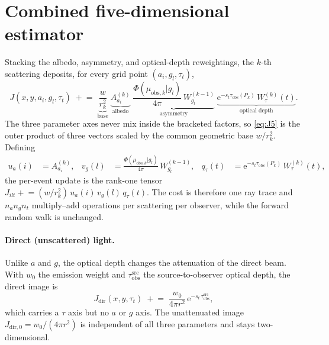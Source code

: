 \documentclass[english,a4paper]{kiseon_memo}
\newcommand{\ee}{\mathrm{e}}
\newcommand{\obs}{\mathrm{obs}}
\newcommand{\HG}{\Phi}
\newcommand{\src}{\mathrm{src}}
\begin{document}
\section{Combined five-dimensional estimator}

Stacking the albedo, asymmetry, and optical-depth reweightings, the $k$-th
scattering deposits, for every grid point $(a_i,g_l,\tau_t)$,
\begin{equation}
  J(x,y,a_i,g_l,\tau_t)\;\mathrel{+}=\;
  \underbrace{\frac{w}{r_k^2}}_{\text{base}}\;
  \underbrace{A_{a_i}^{(k)}}_{\text{albedo}}\;
  \underbrace{\frac{\HG(\mu_{\obs,k}|g_l)}{4\pi}\,W_{g_l}^{(k-1)}}_{\text{asymmetry}}\;
  \underbrace{\ee^{-s_t\tau_\obs(P_k)}\,W_\tau^{(k)}(t)}_{\text{optical depth}} .
  \label{eq:J5}
\end{equation}
The three parameter axes never mix inside the bracketed factors, so
\eqref{eq:J5} is the outer product of three vectors scaled by the common
geometric base $w/r_k^2$.  Defining
\begin{align}
  u_a(i) &= A_{a_i}^{(k)}, &
  v_g(l) &= \frac{\HG(\mu_{\obs,k}|g_l)}{4\pi}\,W_{g_l}^{(k-1)}, &
  q_\tau(t) &= \ee^{-s_t\tau_\obs(P_k)}\,W_\tau^{(k)}(t),
\end{align}
the per-event update is the rank-one tensor
$J_{ilt}\mathrel{+}=(w/r_k^2)\,u_a(i)\,v_g(l)\,q_\tau(t)$.  The cost is therefore
one ray trace and $n_a n_g n_t$ multiply--add operations per scattering per
observer, while the forward random walk is unchanged.

\paragraph{Direct (unscattered) light.}
Unlike $a$ and $g$, the optical depth changes the attenuation of the direct beam.
With $w_0$ the emission weight and $\tau_\obs^{\src}$ the source-to-observer
optical depth, the direct image is
\begin{equation}
  J_{\mathrm{dir}}(x,y,\tau_t)\;\mathrel{+}=\;
  \frac{w_0}{4\pi r^2}\,\ee^{-s_t\,\tau_\obs^{\src}} ,
  \label{eq:direct}
\end{equation}
which carries a $\tau$ axis but no $a$ or $g$ axis.  The unattenuated image
$J_{\mathrm{dir,0}}=w_0/(4\pi r^2)$ is independent of all three parameters and
stays two-dimensional.

\end{document}
